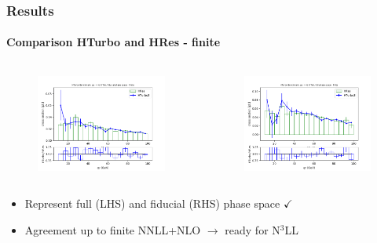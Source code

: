 \documentclass[aspectratio=43]{beamer}
\begin{document}
\begin{frame}

	\frametitle{Results}
	\framesubtitle{Comparison HTurbo and HRes - finite}
	
	\begin{columns}
		
		
		\begin{figure}
			\includegraphics[width = 7cm]{plots/part_III/hturbo_figure_6b_FIN.png}
		\end{figure}
		
		
		\begin{figure}
			\includegraphics[width = 7cm]{plots/part_III/hturbo_figure_7b_FIN.png}
		\end{figure}
		
	\end{columns}
	
	\begin{itemize}
		\item Represent full (LHS) and fiducial (RHS) phase space {\color{darkgreen}$\checkmark$} 
		\item Agreement up to finite NNLL+NLO $\longrightarrow$ {\color{blue}ready for N$^{3}$LL}
	\end{itemize}

\end{frame}
\end{document}
